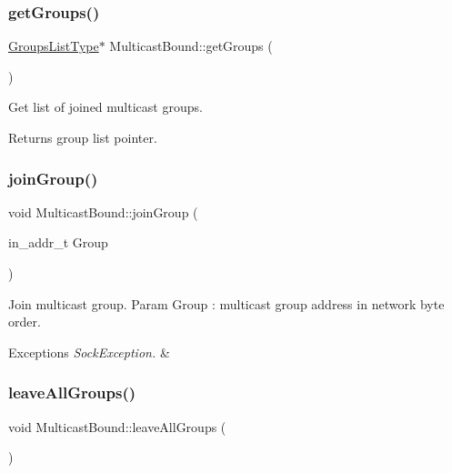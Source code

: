 \subsubsection{\texorpdfstring{get\+Groups()}{getGroups()}}
{\footnotesize\ttfamily \hyperlink{MulticastBound_8h_a9584173a620a338ea7d88264229e36dd}{Groups\+List\+Type}$\ast$ Multicast\+Bound\+::get\+Groups (\begin{DoxyParamCaption}{ }\end{DoxyParamCaption})\hspace{0.3cm}{\ttfamily [inline]}}

Get list of joined multicast groups. \begin{DoxyReturn}{Returns}
group list pointer. 
\end{DoxyReturn}
\mbox{\label{classMulticastBound_acfbbffdce81eb2930757ad6472b9b683}} 
\subsubsection{\texorpdfstring{join\+Group()}{joinGroup()}}
{\footnotesize\ttfamily void Multicast\+Bound\+::join\+Group (\begin{DoxyParamCaption}\item[{in\+\_\+addr\+\_\+t}]{Group }\end{DoxyParamCaption})}

Join multicast group. Param Group \+: multicast group address in network byte order. 
\begin{DoxyExceptions}{Exceptions}
{\em Sock\+Exception.} & \\
\hline
\end{DoxyExceptions}
\mbox{\label{classMulticastBound_a3e61ea82cb090a348a1445b2c2a99dae}} 
\subsubsection{\texorpdfstring{leave\+All\+Groups()}{leaveAllGroups()}}
{\footnotesize\ttfamily void Multicast\+Bound\+::leave\+All\+Groups (\begin{DoxyParamCaption}{ }\end{DoxyParamCaption})}

